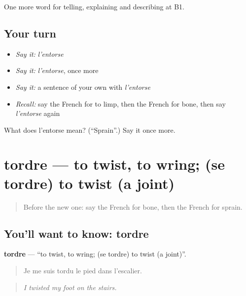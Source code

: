 \begin{grammarlens}[title={What you've built}]
One more word for telling, explaining and describing at B1.
\end{grammarlens}

\subsection*{Your turn}
\begin{itemize}
\raggedright
  \item \emph{Say it:} \emph{l'entorse}
  \item \emph{Say it:} \emph{l'entorse}, once more
  \item \emph{Say it:} a sentence of your own with \emph{l'entorse}
  \item \emph{Recall:} say the French for to limp, then the French for bone, then say \emph{l'entorse} again
\end{itemize}

\begin{tcolorbox}[breakable,colback=teal!4,colframe=teal!35!black,title={Before you move on}]
What does l'entorse mean? (\textquotedblleft{}Sprain\textquotedblright{}.) Say it once more.
\end{tcolorbox}
\section[tordre]{tordre — to twist, to wring; (se tordre) to twist (a joint)}

\label{lesson:FR-C481-tordre}



\begin{quote}
Before the new one: say the French for bone, then the French for sprain.
\end{quote}

\subsection*{You'll want to know: tordre}
\textbf{tordre} — \textquotedblleft{}to twist, to wring; (se tordre) to twist (a joint)\textquotedblright{}.

\begin{quote}
Je me suis tordu le pied dans l'escalier.
\end{quote}

\begin{quote}
\emph{I twisted my foot on the stairs.}
\end{quote}

